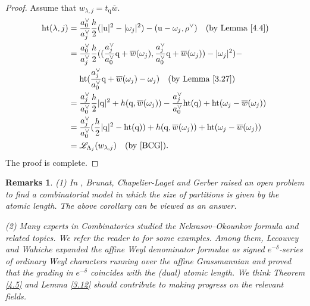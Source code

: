 \documentclass[11pt]{amsart}
\theoremstyle{plain}
\numberwithin{equation}{subsection}
\newtheorem{remarks}[theorem]{Remarks}
\newcommand{\lam}{\lambda}
\begin{document}
\begin{proof}
Assume that $w_{\lam, j}=t_{\mathrm q}\overline{w}$.
\begin{align*}
{\rm ht}(\lam,j)
&=\frac{a_0^{\vee}}{a_j^{\vee}}\frac{h}{2}(|\mathrm{u}|^2-|\omega_{j}|^2)-(\mathrm{u}-\omega_{j},\rho^{\vee})\quad\text{(by Lemma \ref{4.4})}\\ 
&=\frac{a_0^{\vee}}{a_j^{\vee}}\frac{h}{2}((\frac{a_j^{\vee}}{a_0^{\vee}}{\mathrm q}+\overline{w}(\omega_{j}),\frac{a_j^{\vee}}{a_0^{\vee}}{\mathrm q}+\overline{w}(\omega_{j}))-|\omega_{j}|^2)-\\
& \quad\,\,\textup{ht}(\frac{a_j^{\vee}}{a_0^{\vee}}{\mathrm q}+\overline{w}(\omega_{j})-\omega_{j})\quad\text{(by Lemma \ref{3.27})}\\
&=\frac{a_j^{\vee}}{a_0^{\vee}}\frac{h}{2}|{\mathrm q}|^2+h({\mathrm q},\overline{w}(\omega_{j}))-
\frac{a_j^{\vee}}{a_0^{\vee}}\textup{ht}({\mathrm q})+\textup{ht}(\omega_{j}-\overline{w}(\omega_{j}))\\
&=\frac{a_j^{\vee}}{a_0^{\vee}}(\frac{h}{2}|{\mathrm q}|^2-\textup{ht}({\mathrm q}))+h({\mathrm q},\overline{w}(\omega_{j}))+\textup{ht}(\omega_{j}-\overline{w}(\omega_{j}))\\
&=\mathscr{L}_{\Lambda_j}(w_{\lam, j})\quad\text{(by \cite[Proposition 3.2]{BCG})}.
\end{align*}
The proof is complete.
\end{proof}

\begin{remarks}\rm{
(1) In \cite{BCG}, Brunat, Chapelier-Laget and Gerber raised an open problem to 
find a combinatorial model in which the size of partitions is given by the atomic length.
The above corollary can be viewed as an answer.

(2) Many experts in Combinatorics studied the Nekrasov–Okounkov formula and related topics. We refer the reader to \cite{LW, NO, P, W} for some examples. 
Among them, Lecouvey and Wahiche \cite{LW} expanded the affine Weyl denominator formulae as signed $e^{-\delta}$-series of ordinary Weyl characters running over
the affine Grassmannian and proved that the grading in $e^{-\delta}$ coincides with the (dual) atomic length. 
We think Theorem \ref{4.5} and Lemma \ref{3.12} should contribute to making progress on the relevant fields.
}
\end{remarks}
\end{document}
